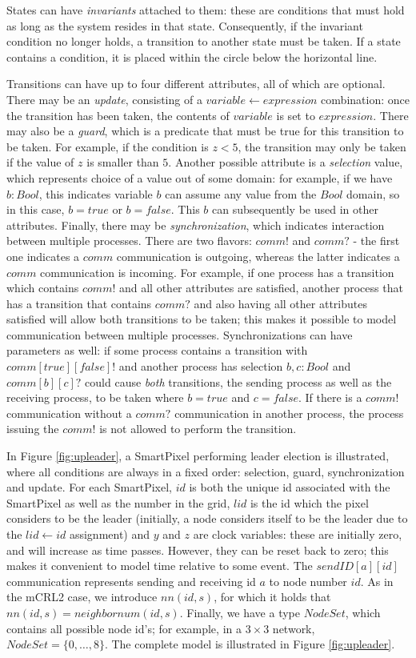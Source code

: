 States can have \emph{invariants} attached to them: these are conditions that must hold as long as the system resides in that state. Consequently, if the invariant condition no longer holds, a transition to another state must be taken. If a state contains a condition, it is placed within the circle below the horizontal line.

Transitions can have up to four different attributes, all of which are optional. There may be an \emph{update}, consisting of a $variable \leftarrow expression$ combination: once the transition has been taken, the contents of $variable$ is set to $expression$. There may also be a \emph{guard}, which is a predicate that must be true for this transition to be taken. For example, if the condition is $z < 5$, the transition may only be taken if the value of $z$ is smaller than $5$. Another possible attribute is a \emph{selection} value, which represents choice of a value out of some domain: for example, if we have $b: Bool$, this indicates variable $b$ can assume any value from the $Bool$ domain, so in this case, $b = true$ or $b = false$. This $b$ can subsequently be used in other attributes. Finally, there may be \emph{synchronization}, which indicates interaction between multiple processes. There are two flavors: $comm!$ and $comm?$ - the first one indicates a $comm$ communication is outgoing, whereas the latter indicates a $comm$ communication is incoming. For example, if one process has a transition which contains $comm!$ and all other attributes are satisfied, another process that has a transition that contains $comm?$ and also having all other attributes satisfied will allow both transitions to be taken; this makes it possible to model communication between multiple processes. Synchronizations can have parameters as well: if some process contains a transition with $comm[true][false]!$ and another process has selection $b, c : Bool$ and $comm[b][c]?$ could cause \emph{both} transitions, the sending process as well as the receiving process, to be taken where $b = true$ and $c = false$. If there is a $comm!$ communication without a $comm?$ communication in another process, the process issuing the $comm!$ is not allowed to perform the transition.

In Figure \ref{fig:upleader}, a SmartPixel performing leader election is illustrated, where all conditions are always in a fixed order: selection, guard, synchronization and update. For each SmartPixel, $id$ is both the unique id associated with the SmartPixel as well as the number in the grid, $lid$ is the id which the pixel considers to be the leader (initially, a node considers itself to be the leader due to the $lid \leftarrow id$ assignment) and $y$ and $z$ are clock variables: these are initially zero, and will increase as time passes. However, they can be reset back to zero; this makes it convenient to model time relative to some event. The $sendID[a][id]$ communication represents sending and receiving id $a$ to node number $id$. As in the mCRL2 case, we introduce $nn(id,s)$, for which it holds that $nn(id,s) = neighbornum(id,s)$. Finally, we have a type $NodeSet$, which contains all possible node id's; for example, in a $3 \times 3$ network, $NodeSet = \{ 0, \dots, 8 \}$. The complete model is illustrated in Figure \ref{fig:upleader}.

